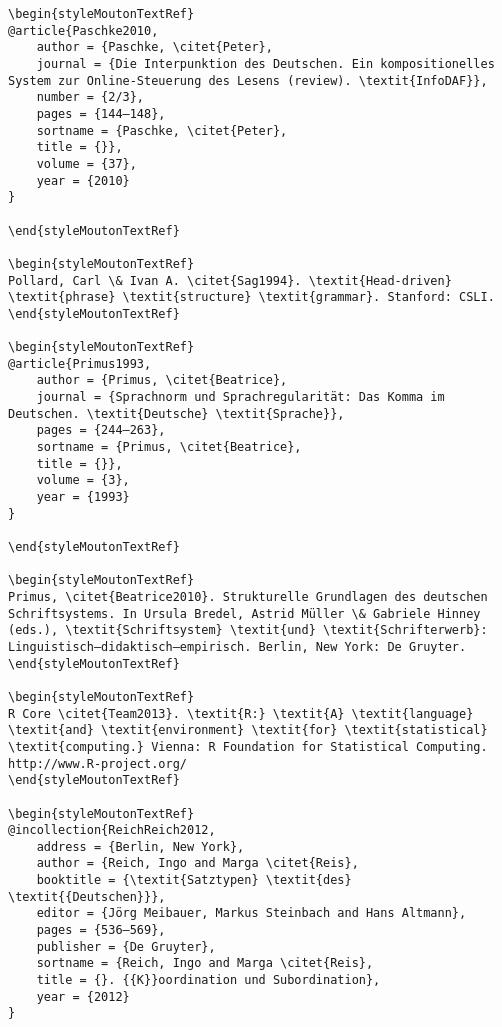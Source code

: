 \begin{styleMoutonHeadingRef}
\begin{verbatim}
\begin{styleMoutonTextRef}
@article{Paschke2010,
	author = {Paschke, \citet{Peter},
	journal = {Die Interpunktion des Deutschen. Ein kompositionelles System zur Online-Steuerung des Lesens (review). \textit{InfoDAF}},
	number = {2/3},
	pages = {144–148},
	sortname = {Paschke, \citet{Peter},
	title = {}},
	volume = {37},
	year = {2010}
}

\end{styleMoutonTextRef}

\begin{styleMoutonTextRef}
Pollard, Carl \& Ivan A. \citet{Sag1994}. \textit{Head-driven} \textit{phrase} \textit{structure} \textit{grammar}. Stanford: CSLI.
\end{styleMoutonTextRef}

\begin{styleMoutonTextRef}
@article{Primus1993,
	author = {Primus, \citet{Beatrice},
	journal = {Sprachnorm und Sprachregularität: Das Komma im Deutschen. \textit{Deutsche} \textit{Sprache}},
	pages = {244–263},
	sortname = {Primus, \citet{Beatrice},
	title = {}},
	volume = {3},
	year = {1993}
}

\end{styleMoutonTextRef}

\begin{styleMoutonTextRef}
Primus, \citet{Beatrice2010}. Strukturelle Grundlagen des deutschen Schriftsystems. In Ursula Bredel, Astrid Müller \& Gabriele Hinney (eds.), \textit{Schriftsystem} \textit{und} \textit{Schrifterwerb}: Linguistisch—didaktisch—empirisch. Berlin, New York: De Gruyter.
\end{styleMoutonTextRef}

\begin{styleMoutonTextRef}
R Core \citet{Team2013}. \textit{R:} \textit{A} \textit{language} \textit{and} \textit{environment} \textit{for} \textit{statistical} \textit{computing.} Vienna: R Foundation for Statistical Computing. http://www.R-project.org/
\end{styleMoutonTextRef}

\begin{styleMoutonTextRef}
@incollection{ReichReich2012,
	address = {Berlin, New York},
	author = {Reich, Ingo and Marga \citet{Reis},
	booktitle = {\textit{Satztypen} \textit{des} \textit{{Deutschen}}},
	editor = {Jörg Meibauer, Markus Steinbach and Hans Altmann},
	pages = {536–569},
	publisher = {De Gruyter},
	sortname = {Reich, Ingo and Marga \citet{Reis},
	title = {}. {{K}}oordination und Subordination},
	year = {2012}
}


\end{verbatim}
\end{styleMoutonHeadingRef}
